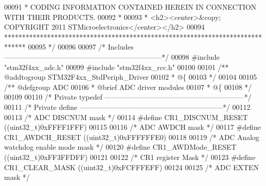 \begin{DoxyCode}
00091 \textcolor{comment}{  * CODING INFORMATION CONTAINED HEREIN IN CONNECTION WITH THEIR PRODUCTS.}
00092 \textcolor{comment}{  *}
00093 \textcolor{comment}{  * <h2><center>&copy; COPYRIGHT 2011 STMicroelectronics</center></h2>}
00094 \textcolor{comment}{  ******************************************************************************  }
00095 \textcolor{comment}{  */}
00096 
00097 \textcolor{comment}{/* Includes ------------------------------------------------------------------*/}
00098 \textcolor{preprocessor}{#}\textcolor{preprocessor}{include} "stm32f4xx_adc.h"
00099 \textcolor{preprocessor}{#}\textcolor{preprocessor}{include} "stm32f4xx_rcc.h"
00100 
00101 \textcolor{comment}{/** @addtogroup STM32F4xx\_StdPeriph\_Driver}
00102 \textcolor{comment}{  * @\{}
00103 \textcolor{comment}{  */}
00104 
00105 \textcolor{comment}{/** @defgroup ADC }
00106 \textcolor{comment}{  * @brief ADC driver modules}
00107 \textcolor{comment}{  * @\{}
00108 \textcolor{comment}{  */}
00109 
00110 \textcolor{comment}{/* Private typedef -----------------------------------------------------------*/}
00111 \textcolor{comment}{/* Private define ------------------------------------------------------------*/}
00112 
00113 \textcolor{comment}{/* ADC DISCNUM mask */}
00114 \textcolor{preprocessor}{#}\textcolor{preprocessor}{define} \textcolor{preprocessor}{CR1\_DISCNUM\_RESET}         \textcolor{preprocessor}{(}\textcolor{preprocessor}{(}\textcolor{preprocessor}{uint32\_t}\textcolor{preprocessor}{)}0xFFFF1FFF\textcolor{preprocessor}{)}
00115 
00116 \textcolor{comment}{/* ADC AWDCH mask */}
00117 \textcolor{preprocessor}{#}\textcolor{preprocessor}{define} \textcolor{preprocessor}{CR1\_AWDCH\_RESET}           \textcolor{preprocessor}{(}\textcolor{preprocessor}{(}\textcolor{preprocessor}{uint32\_t}\textcolor{preprocessor}{)}0xFFFFFFE0\textcolor{preprocessor}{)}
00118 
00119 \textcolor{comment}{/* ADC Analog watchdog enable mode mask */}
00120 \textcolor{preprocessor}{#}\textcolor{preprocessor}{define} \textcolor{preprocessor}{CR1\_AWDMode\_RESET}         \textcolor{preprocessor}{(}\textcolor{preprocessor}{(}\textcolor{preprocessor}{uint32\_t}\textcolor{preprocessor}{)}0xFF3FFDFF\textcolor{preprocessor}{)}
00121 
00122 \textcolor{comment}{/* CR1 register Mask */}
00123 \textcolor{preprocessor}{#}\textcolor{preprocessor}{define} \textcolor{preprocessor}{CR1\_CLEAR\_MASK}            \textcolor{preprocessor}{(}\textcolor{preprocessor}{(}\textcolor{preprocessor}{uint32\_t}\textcolor{preprocessor}{)}0xFCFFFEFF\textcolor{preprocessor}{)}
00124 
00125 \textcolor{comment}{/* ADC EXTEN mask */}

\end{DoxyCode}
